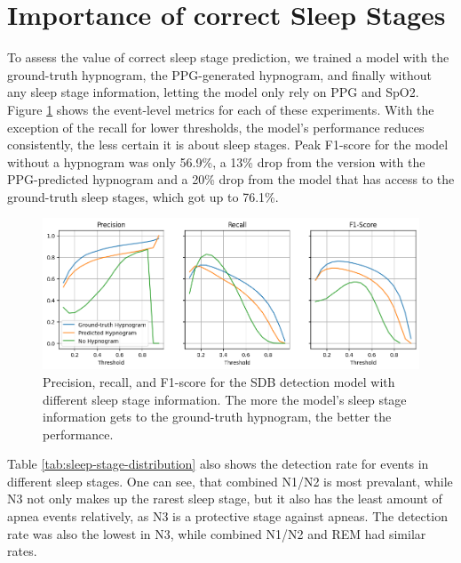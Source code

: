 \section{Importance of correct Sleep Stages}

To assess the value of correct sleep stage prediction, we trained a model with the ground-truth hypnogram, the PPG-generated hypnogram, and finally without any sleep stage information, letting the model only rely on PPG and SpO2. Figure \ref{fig:sleep-stage-importance} shows the event-level metrics for each of these experiments. With the exception of the recall for lower thresholds, the model's performance reduces consistently, the less certain it is about sleep stages. Peak F1-score for the model without a hypnogram was only 56.9\%, a 13\% drop from the version with the PPG-predicted hypnogram and a 20\% drop from the model that has access to the ground-truth sleep stages, which got up to 76.1\%.

\begin{figure}
    \centering
    \includegraphics[width=\textwidth]{images/SleepStages}
    \caption{Precision, recall, and F1-score for the SDB detection model with different sleep stage information. The more the model's sleep stage information gets to the ground-truth hypnogram, the better the performance.}
    \label{fig:sleep-stage-importance}
\end{figure}

Table \ref{tab:sleep-stage-distribution} also shows the detection rate for events in different sleep stages. One can see, that combined N1/N2 is most prevalant, while N3 not only makes up the rarest sleep stage, but it also has the least amount of apnea events relatively, as N3 is a protective stage against apneas. The detection rate was also the lowest in N3, while combined N1/N2 and REM had similar rates.

